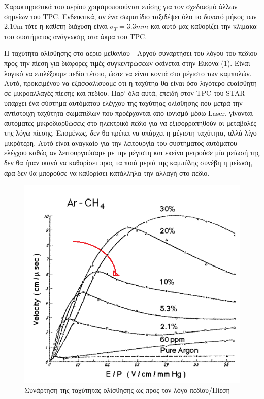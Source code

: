 	Χαρακτηριστικά του αερίου χρησιμοποιούνται επίσης για τον σχεδιασμό άλλων σημείων του TPC. Ενδεικτικά, αν ένα σωματίδιο ταξιδέψει όλο το δυνατό μήκος των 2.10m τότε η κάθετη διάχυση είναι $\sigma_T=3.3mm$ και αυτό μας καθορίζει την κλίμακα του συστήματος ανάγνωσης στα άκρα του TPC.

	
	Η ταχύτητα ολίσθησης στο αέριο μεθανίου -  Αργού συναρτήσει του λόγου του πεδίου προς την πίεση για διάφορες τιμές συγκεντρώσεων φαίνεται στην Εικόνα (\ref{fig3.7}). Είναι λογικό να επιλέξουμε πεδίο τέτοιο, ώστε να είναι κοντά στο μέγιστο των καμπυλών. Αυτό, προκειμένου να εξασφαλίσυομε ότι η ταχύτηα θα είναι όσο λιγότερο ευαίσθητη σε μικροαλλαγές πίεσης και πεδίου. Παρ' όλα αυτά, επειδή στον TPC του STAR υπάρχει ένα σύστημα αυτόματου ελέγχου της ταχύτηας ολίσθησης που μετρά την αντίστοιχη ταχύτητα σωματιδίων που προέρχονται από ιονισμό μέσω Laser, γίνονται αυτόματες μικροδιορθώσεις στο ηλεκτρικό πεδίο για να εξισορροπηθούν οι μεταβολές της λόγω πίεσης. Επομένως, δεν θα πρέπει να υπάρχει η μέγιστη ταχύτητα, αλλά λίγο μικρότερη. Αυτό είναι αναγκαίο για την λειτουργία του συστήματος αυτόματου ελέγχου καθώς αν λειτουργούσαμε με την μέγιστη και εκείνο μετρούσε μία μείωσή της δεν θα ήταν ικανό να καθορίσει προς τα ποιά μεριά της καμπύλης συνέβη η μείωση, άρα δεν θα μπορούσε να καθορίσει κατάλληλα την αλλαγή στο πεδίο.
	
	\begin{figure}[h!]
		\centering
		\includegraphics[scale=0.45]{STAR_Detectors/Gases}
   	\caption{Συνάρτηση της ταχύτητας ολίσθησης ως προς τον λόγο πεδίου/Πίεση }
		\label{fig3.7}
	\end{figure}	
	
